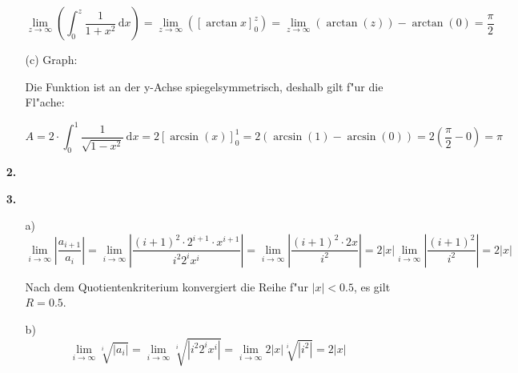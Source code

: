 \documentclass[a4paper,11pt,fleqn]{scrartcl}
\newcommand{\bra}[1]{\left(#1\right)}
\newcommand{\limz}[1]{\lim\limits_{z \rightarrow \infty}\bra{#1}}
\newcommand{\dX}[1]{\, \mathrm{d}#1}
\newcommand{\dx}[0]{\dX{x}}
\begin{document}
\begin{enumerate}
\begin{enumerate}
        \[ \limz{\int_0^z \frac{1}{1+x^2} \dx} = \limz{\left[ \arctan x \right]_0^z}  =
            \limz{\arctan(z)} - \arctan(0) = \frac{\pi}{2} \]

    \item[(c)]
        Graph:


        Die Funktion ist an der y-Achse spiegelsymmetrisch, deshalb gilt f"ur die Fl"ache:

        \[ A = 2 \cdot \int_0^1 \frac{1}{\sqrt{1-x^2}} \dx = 2 \left[ \arcsin(x) \right]_0^1 = 2 \bra{\arcsin(1)-\arcsin(0)} = 2(\frac{\pi}{2} - 0) = \pi \]

    \end{enumerate}

\item[\textbf{2.}]


\item[\textbf{3.}]
    \begin{enumerate}
        
    \item[a)]
        \[ 
        \lim_{i\rightarrow\infty} \left| \frac{a_{i+1}}{a_i}\right| =
        \lim_{i\rightarrow\infty} \left| \frac{(i+1)^2\cdot 2^{i+1}\cdot x^{i+1}}{i^2 2^i x^i}\right| =
        \lim_{i\rightarrow\infty} \left| \frac{(i+1)^2\cdot 2x}{i^2}\right| =
        2\left| x\right|\lim_{i\rightarrow\infty} \left| \frac{(i+1)^2}{i^2}\right| =
        2\left| x \right|
        \]

        Nach dem Quotientenkriterium konvergiert die Reihe f"ur $|x| < 0.5$, es gilt $R = 0.5$.

    \item[b)]
        \[
        \lim_{i\rightarrow\infty} \sqrt[i]{|a_i|} =
        \lim_{i\rightarrow\infty}  \sqrt[i]{|i^2 2^i x^i|} =
        \lim_{i\rightarrow\infty}  2|x|\sqrt[i]{|i^2|} =
        2|x|
        \]


\end{enumerate}
\end{enumerate}
\end{document}
